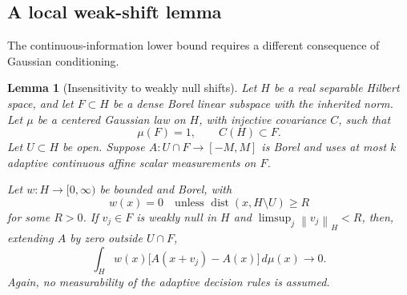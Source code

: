 \documentclass[11pt,a4paper]{article}
\newcommand{\norm}[1]{\left\lVert#1\right\rVert}
\newtheorem{lemma}[theorem]{Lemma}
\theoremstyle{definition}
\theoremstyle{remark}
\numberwithin{equation}{section}
\begin{document}
\subsection{A local weak-shift lemma}

The continuous-information lower bound requires a different
consequence of Gaussian conditioning.

\begin{lemma}[Insensitivity to weakly null shifts]
\label{lem:weakshift}
Let \(H\) be a real separable Hilbert space, and let \(F\subset H\)
be a dense Borel linear subspace with the inherited norm. Let \(\mu\)
be a centered Gaussian law on \(H\), with injective covariance \(C\),
such that
\[
                       \mu(F)=1,\qquad C(H)\subset F.
 \tag{W1}
\]
Let \(U\subset H\) be open. Suppose
\(A:U\cap F\to[-M,M]\) is Borel and uses at most \(k\) adaptive
continuous affine scalar measurements on \(F\).

Let \(w:H\to[0,\infty)\) be bounded and Borel, with
\[
             w(x)=0\quad\text{unless }
             \operatorname{dist}(x,H\setminus U)\ge R
 \tag{W2}
\]
for some \(R>0\). If \(v_j\in F\) is weakly null in \(H\) and
\(\limsup_j\norm{v_j}_H<R\), then, extending \(A\) by zero outside
\(U\cap F\),
\[
             \int_H w(x)\bigl[A(x+v_j)-A(x)\bigr]\,d\mu(x)
                        \longrightarrow0.
 \tag{W3}
\]
Again, no measurability of the adaptive decision rules is assumed.
\end{lemma}
\end{document}
